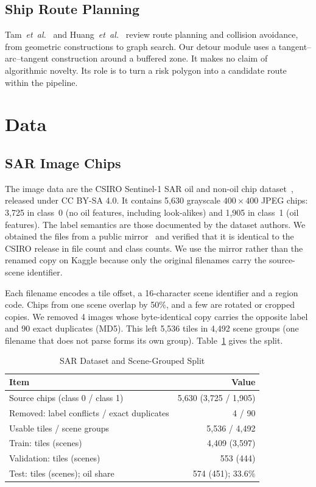 \documentclass[conference]{IEEEtran}
\begin{document}
\subsection{Ship Route Planning}
Tam~\emph{et~al.}~\cite{tam2009} and Huang~\emph{et~al.}~\cite{huang2020} review route
planning and collision avoidance, from geometric constructions to graph search. Our
detour module uses a tangent--arc--tangent construction around a buffered zone. It makes
no claim of algorithmic novelty. Its role is to turn a risk polygon into a candidate
route within the pipeline.

\section{Data}

\subsection{SAR Image Chips}
\label{sec:sar}
The image data are the CSIRO Sentinel-1 SAR oil and non-oil chip
dataset~\cite{csiro2022}, released under CC BY-SA 4.0. It contains 5,630 grayscale
$400\times400$ JPEG chips: 3,725 in class~0 (no oil features, including look-alikes)
and 1,905 in class~1 (oil features). The label semantics are those documented by the
dataset authors. We obtained the files from a public mirror~\cite{mirror} and verified
that it is identical to the CSIRO release in file count and class counts. We use the
mirror rather than the renamed copy on Kaggle because only the original filenames carry
the source-scene identifier.

Each filename encodes a tile offset, a 16-character scene identifier and a region code.
Chips from one scene overlap by 50\%, and a few are rotated or cropped copies. We
removed 4 images whose byte-identical copy carries the opposite label and 90 exact
duplicates (MD5). This left 5,536 tiles in 4,492 scene groups (one filename that does
not parse forms its own group). Table~\ref{tab:sar} gives the split.

\begin{table}[t]
\caption{SAR Dataset and Scene-Grouped Split}
\label{tab:sar}
\centering
\footnotesize
\begin{tabular}{@{}lr@{}}
\toprule
Item & Value \\
\midrule
Source chips (class 0 / class 1) & 5,630 (3,725 / 1,905) \\
Removed: label conflicts / exact duplicates & 4 / 90 \\
Usable tiles / scene groups & 5,536 / 4,492 \\
Train: tiles (scenes) & 4,409 (3,597) \\
Validation: tiles (scenes) & 553 (444) \\
Test: tiles (scenes); oil share & 574 (451); 33.6\% \\
\bottomrule
\end{tabular}
\end{table}
\end{document}
